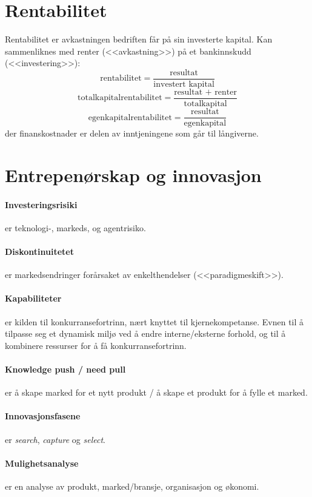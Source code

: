 \documentclass[a4paper]{article}
\newcommand{\textfrac}[2]{\frac{\text{#1}}{\text{#2}}}
\begin{document}
\section{Rentabilitet}
Rentabilitet er avkastningen bedriften får på sin investerte kapital. Kan sammenliknes med renter (<<avkastning>>) på et bankinnskudd (<<investering>>):
$$\text{rentabilitet} = \textfrac{resultat}{investert kapital}$$
$$\text{totalkapitalrentabilitet} = \textfrac{resultat + renter}{totalkapital}$$
$$\text{egenkapitalrentabilitet} = \textfrac{resultat}{egenkapital}$$
der finanskostnader er delen av inntjeningene som går til långiverne.


\section{Entrepenørskap og innovasjon}
\paragraph{Investeringsrisiki} er teknologi-, markeds, og agentrisiko.
\paragraph{Diskontinuitetet} er markedsendringer forårsaket av enkelthendelser (<<paradigmeskift>>).
\paragraph{Kapabiliteter} er kilden til konkurransefortrinn, nært knyttet til kjernekompetanse. Evnen til å tilpasse seg et dynamisk miljø ved å endre interne/eksterne forhold, og til å kombinere ressurser for å få konkurransefortrinn.
\paragraph{Knowledge push / need pull} er å skape marked for et nytt produkt / å skape et produkt for å fylle et marked.
\paragraph{Innovasjonsfasene} er \emph{search}, \emph{capture} og \emph{select}.
\paragraph{Mulighetsanalyse} er en analyse av produkt, marked/bransje, organisasjon og økonomi.
\end{document}
